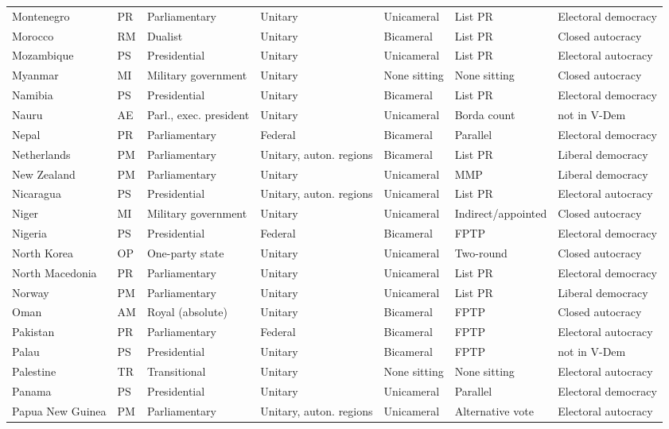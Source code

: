 \documentclass[11pt,a4paper]{article}
\begin{document}
{\begin{longtable}{p{2.9cm}lp{2.9cm}p{2.4cm}lp{1.9cm}p{2.0cm}}
Montenegro & PR & Parliamentary & Unitary & Unicameral & List PR & Electoral democracy\\
Morocco & RM & Dualist & Unitary & Bicameral & List PR & Closed autocracy\\
Mozambique & PS & Presidential & Unitary & Unicameral & List PR & Electoral autocracy\\
Myanmar & MI & Military government & Unitary & None sitting & None sitting & Closed autocracy\\
Namibia & PS & Presidential & Unitary & Bicameral & List PR & Electoral democracy\\
Nauru & AE & Parl., exec. president & Unitary & Unicameral & Borda count & not in V-Dem\\
Nepal & PR & Parliamentary & Federal & Bicameral & Parallel & Electoral democracy\\
Netherlands & PM & Parliamentary & Unitary, auton. regions & Bicameral & List PR & Liberal democracy\\
New Zealand & PM & Parliamentary & Unitary & Unicameral & MMP & Liberal democracy\\
Nicaragua & PS & Presidential & Unitary, auton. regions & Unicameral & List PR & Electoral autocracy\\
Niger & MI & Military government & Unitary & Unicameral & Indirect/appointed & Closed autocracy\\
Nigeria & PS & Presidential & Federal & Bicameral & FPTP & Electoral democracy\\
North Korea & OP & One-party state & Unitary & Unicameral & Two-round & Closed autocracy\\
North Macedonia & PR & Parliamentary & Unitary & Unicameral & List PR & Electoral democracy\\
Norway & PM & Parliamentary & Unitary & Unicameral & List PR & Liberal democracy\\
Oman & AM & Royal (absolute) & Unitary & Bicameral & FPTP & Closed autocracy\\
Pakistan & PR & Parliamentary & Federal & Bicameral & FPTP & Electoral autocracy\\
Palau & PS & Presidential & Unitary & Bicameral & FPTP & not in V-Dem\\
Palestine & TR & Transitional & Unitary & None sitting & None sitting & Electoral autocracy\\
Panama & PS & Presidential & Unitary & Unicameral & Parallel & Electoral democracy\\
Papua New Guinea & PM & Parliamentary & Unitary, auton. regions & Unicameral & Alternative vote & Electoral autocracy\\

\end{longtable}}
\end{document}
